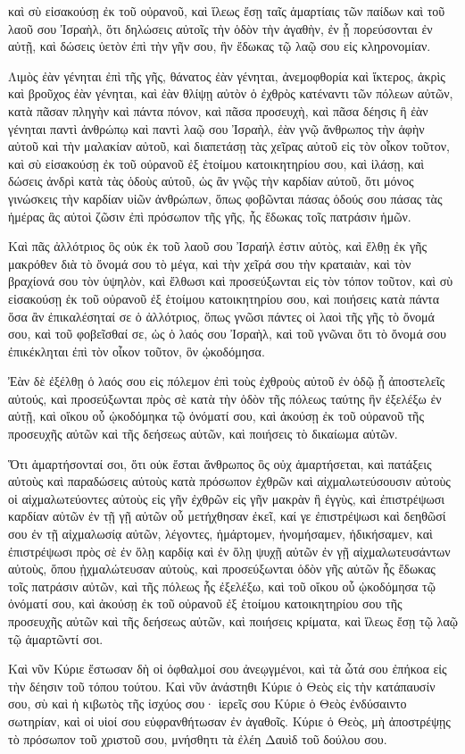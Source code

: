 {καὶ σὺ εἰσακούσῃ ἐκ τοῦ οὐρανοῦ, καὶ ἵλεως ἔσῃ ταῖς ἁμαρτίαις τῶν παίδων καὶ τοῦ λαοῦ σου Ἰσραὴλ, ὅτι δηλώσεις αὐτοῖς τὴν ὁδὸν τὴν ἀγαθὴν, ἐν ᾗ πορεύσονται ἐν αὐτῇ, καὶ δώσεις ὑετὸν ἐπὶ τὴν γῆν σου, ἣν ἔδωκας τῷ λαῷ σου εἰς κληρονομίαν.
\par }{\PP {}Λιμὸς ἐὰν γένηται ἐπὶ τῆς γῆς, θάνατος ἐὰν γένηται, ἀνεμοφθορία καὶ ἴκτερος, ἀκρὶς καὶ βροῦχος ἐὰν γένηται, καὶ ἐὰν θλίψῃ αὐτὸν ὁ ἐχθρὸς κατέναντι τῶν πόλεων αὐτῶν, κατὰ πᾶσαν πληγὴν καὶ πάντα πόνον,
καὶ πᾶσα προσευχὴ, καὶ πᾶσα δέησις ἣ ἐὰν γένηται παντὶ ἀνθρώπῳ καὶ παντὶ λαῷ σου Ἰσραὴλ, ἐὰν γνῷ ἄνθρωπος τὴν ἁφὴν αὐτοῦ καὶ τὴν μαλακίαν αὐτοῦ, καὶ διαπετάσῃ τὰς χεῖρας αὐτοῦ εἰς τὸν οἶκον τοῦτον,
καὶ σὺ εἰσακούσῃ ἐκ τοῦ οὐρανοῦ ἐξ ἑτοίμου κατοικητηρίου σου, καὶ ἱλάσῃ, καὶ δώσεις ἀνδρὶ κατὰ τὰς ὁδοὺς αὐτοῦ, ὡς ἂν γνῷς τὴν καρδίαν αὐτοῦ, ὅτι μόνος γινώσκεις τὴν καρδίαν υἱῶν ἀνθρώπων,
ὅπως φοβῶνται πάσας ὁδούς σου πάσας τὰς ἡμέρας ἃς αὐτοὶ ζῶσιν ἐπὶ πρόσωπον τῆς γῆς, ἧς ἔδωκας τοῖς πατράσιν ἡμῶν.
\par }{\PP {}Καὶ πᾶς ἀλλότριος ὃς οὐκ ἐκ τοῦ λαοῦ σου Ἰσραήλ ἐστιν αὐτὸς, καὶ ἔλθῃ ἐκ γῆς μακρόθεν διὰ τὸ ὄνομά σου τὸ μέγα, καὶ τὴν χεῖρά σου τὴν κραταιὰν, καὶ τὸν βραχίονά σου τὸν ὑψηλὸν, καὶ ἔλθωσι καὶ προσεύξωνται εἰς τὸν τόπον τοῦτον,
καὶ σὺ εἰσακούσῃ ἐκ τοῦ οὐρανοῦ ἐξ ἑτοίμου κατοικητηρίου σου, καὶ ποιήσεις κατὰ πάντα ὅσα ἂν ἐπικαλέσηταί σε ὁ ἀλλότριος, ὅπως γνῶσι πάντες οἱ λαοὶ τῆς γῆς τὸ ὄνομά σου, καὶ τοῦ φοβεῖσθαί σε, ὡς ὁ λαός σου Ἰσραὴλ, καὶ τοῦ γνῶναι ὅτι τὸ ὄνομά σου ἐπικέκληται ἐπὶ τὸν οἶκον τοῦτον, ὃν ᾠκοδόμησα.
\par }{\PP {}Ἐὰν δὲ ἐξέλθῃ ὁ λαός σου εἰς πόλεμον ἐπὶ τοὺς ἐχθροὺς αὐτοῦ ἐν ὁδῷ ᾗ ἀποστελεῖς αὐτούς, καὶ προσεύξωνται πρὸς σὲ κατὰ τὴν ὁδὸν τῆς πόλεως ταύτης ἣν ἐξελέξω ἐν αὐτῇ, καὶ οἴκου οὗ ᾠκοδόμηκα τῷ ὀνόματί σου,
καὶ ἀκούσῃ ἐκ τοῦ οὐρανοῦ τῆς προσευχῆς αὐτῶν καὶ τῆς δεήσεως αὐτῶν, καὶ ποιήσεις τὸ δικαίωμα αὐτῶν.
\par }{\PP {}Ὅτι ἁμαρτήσονταί σοι, ὅτι οὐκ ἔσται ἄνθρωπος ὃς οὐχ ἁμαρτήσεται, καὶ πατάξεις αὐτοὺς καὶ παραδώσεις αὐτοὺς κατὰ πρόσωπον ἐχθρῶν καὶ αἰχμαλωτεύσουσιν αὐτοὺς οἱ αἰχμαλωτεύοντες αὐτοὺς εἰς γῆν ἐχθρῶν εἰς γῆν μακρὰν ἢ ἐγγὺς,
καὶ ἐπιστρέψωσι καρδίαν αὐτῶν ἐν τῇ γῇ αὐτῶν οὗ μετήχθησαν ἐκεῖ, καί γε ἐπιστρέψωσι καὶ δεηθῶσί σου ἐν τῇ αἰχμαλωσίᾳ αὐτῶν, λέγοντες, ἡμάρτομεν, ἠνομήσαμεν, ἠδικήσαμεν,
καὶ ἐπιστρέψωσι πρὸς σὲ ἐν ὅλῃ καρδίᾳ καὶ ἐν ὅλῃ ψυχῇ αὐτῶν ἐν γῇ αἰχμαλωτευσάντων αὐτοὺς, ὅπου ᾐχμαλώτευσαν αὐτοὺς, καὶ προσεύξωνται ὁδὸν γῆς αὐτῶν ἧς ἔδωκας τοῖς πατράσιν αὐτῶν, καὶ τῆς πόλεως ἧς ἐξελέξω, καὶ τοῦ οἴκου οὗ ᾠκοδόμησα τῷ ὀνόματί σου,
καὶ ἀκούσῃ ἐκ τοῦ οὐρανοῦ ἐξ ἑτοίμου κατοικητηρίου σου τῆς προσευχῆς αὐτῶν καὶ τῆς δεήσεως αὐτῶν, καὶ ποιήσεις κρίματα, καὶ ἵλεως ἔσῃ τῷ λαῷ τῷ ἁμαρτῶντί σοι.
\par }{\PP {}Καὶ νῦν Κύριε ἔστωσαν δὴ οἱ ὀφθαλμοί σου ἀνεῳγμένοι, καὶ τὰ ὦτά σου ἐπήκοα εἰς τὴν δέησιν τοῦ τόπου τούτου.
Καὶ νῦν ἀνάστηθι Κύριε ὁ Θεὸς εἰς τὴν κατάπαυσίν σου, σὺ καὶ ἡ κιβωτὸς τῆς ἰσχύος σου· ἱερεῖς σου Κύριε ὁ Θεὸς ἐνδύσαιντο σωτηρίαν, καὶ οἱ υἱοί σου εὐφρανθήτωσαν ἐν ἀγαθοῖς.
Κύριε ὁ Θεὸς, μὴ ἀποστρέψῃς τὸ πρόσωπον τοῦ χριστοῦ σου, μνήσθητι τὰ ἐλέη Δαυὶδ τοῦ δούλου σου.

}
